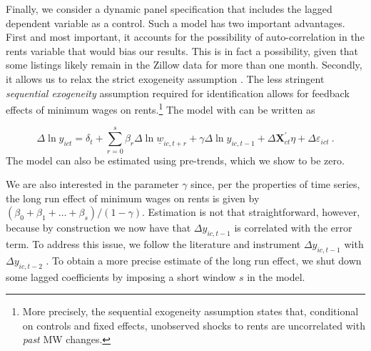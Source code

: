 
Finally, we consider a dynamic panel specification that includes the lagged dependent variable 
as a control. Such a model has two important advantages. First and most important, it accounts 
for the possibility of auto-correlation in the rents variable that would bias our results. This 
is in fact a possibility, given that some listings likely remain in the Zillow data for more 
than one month. Secondly, it allows us to relax the strict exogeneity assumption 
\parencite{ArellanoHonore2001}. The less stringent \textit{sequential exogeneity} assumption 
required for identification allows for feedback effects of minimum wages on rents.\footnote{More 
	precisely, the sequential exogeneity assumption states that, conditional on controls and 
	fixed 	effects, unobserved shocks to rents are uncorrelated with \textit{past} MW changes.}
The model with can be written as

\begin{equation}\label{eq:ab_panel}
	\Delta \ln y_{ict} = \delta_t
						+ \sum_{r=0}^{s} \beta_r \Delta \ln \underline{w}_{ic,t+r}
						+ \gamma \Delta \ln y_{ic,t-1} + \Delta \mathbf{X}^{'}_{ct}\eta
						+ \Delta \varepsilon_{ict} \ .
\end{equation}
The model can also be estimated using pre-trends, which we show to be zero.

We are also interested in the parameter $\gamma$ since, per the properties of time series, the 
long run effect of minimum wages on rents is given by $(\beta_0 + \beta_1 + \dots + 
\beta_s)/(1-\gamma)$. Estimation is not that straightforward, however, because by construction 
we now have that $\Delta y_{ic,t-1}$ is correlated with the error term. To address this issue,
we follow the literature and instrument $\Delta y_{ic,t-1}$ with $\Delta y_{ic,t-2}$ 
\parencite{ArellanoHonore2001}. To obtain a more precise estimate of the long run effect, we 
shut down some lagged coefficients by imposing a short window $s$ in the model.

